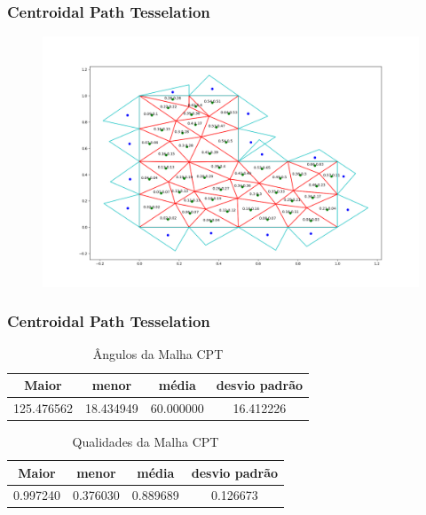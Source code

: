 \documentclass{beamer}
\begin{document}
\begin{frame}
  \frametitle{Centroidal Path Tesselation}

  \begin{figure}
    \includegraphics[width=0.6\linewidth]{malha-cpt.png}
  \end{figure}

\end{frame}


\begin{frame}
  \frametitle{Centroidal Path Tesselation}

  \begin{table}[hb]
    \centering
    \par\caption{Ângulos da Malha CPT}
    \begin{tabular}{c|c|c|c}
      Maior      & menor     & média     & desvio padrão \\\hline\hline
      125.476562 & 18.434949 & 60.000000 & 16.412226     \\\hline
    \end{tabular}
    \label{tab:angulos-malha-cpt}
  \end{table}

  \begin{table}[hb]
    \centering
    \par\caption{Qualidades da Malha CPT}
    \begin{tabular}{c|c|c|c}
      Maior    & menor    & média    & desvio padrão \\\hline\hline
      0.997240 & 0.376030 & 0.889689 & 0.126673      \\\hline
    \end{tabular}
    \label{tab:qualidades-malha-cpt}
  \end{table}

\end{frame}
\end{document}

